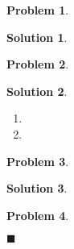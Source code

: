 \documentclass[10pt]{article}
\author{}
\title{}
\date{\today}
\theoremstyle{plain}
\theoremstyle{definition}
\newtheorem{prob}{Problem}
\newtheorem*{sol}{Solution}
\theoremstyle{remark}
\begin{document}
\begin{prob}

\end{prob}

\medskip

\begin{sol}

\end{sol}

\pagebreak

\begin{prob}

\end{prob}

\medskip

\begin{sol}

\end{sol}

\medskip

\begin{enumerate}[label=(\roman*)]
    \item 
    \item 
\end{enumerate}

\pagebreak

\begin{prob}

\end{prob}

\medskip

\begin{sol}

\end{sol}

\medskip

\begin{description}
    \item 
    \item 
\end{description}

\pagebreak

\begin{prob}

\end{prob}

\medskip

\begin{pf}


\newline
$\blacksquare$ \\
\end{pf}
\end{document}
